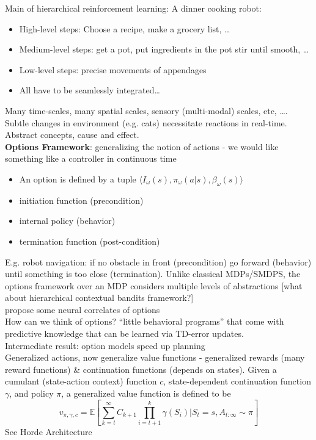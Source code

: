 \documentclass[12pt]{article}
\begin{document}
Main of hierarchical reinforcement learning: A dinner cooking robot:
\begin{itemize}
    \item High-level steps: Choose a recipe, make a grocery list, \ldots
    \item Medium-level steps: get a pot, put ingredients in the pot stir until smooth, \ldots
    \item Low-level steps: precise movements of appendages
    \item All have to be seamlessly integrated\ldots
\end{itemize}
Many time-scales, many spatial scales, sensory (multi-modal) scales, etc, \ldots. Subtle changes in environment (e.g. cats) necessitate reactions in real-time. Abstract concepts, cause and effect. \\

\textbf{Options Framework}\cite{Sutton98}: generalizing the notion of actions - we would like something like a controller in continuous time
\begin{itemize}
    \item An option is defined by a tuple $\langle I_\omega(s), \pi_\omega(a|s), \beta_\omega(s) \rangle$
    \item initiation function (precondition)
    \item internal policy (behavior)
    \item termination function (post-condition)
\end{itemize}
E.g. robot navigation: if no obstacle in front (precondition) go forward (behavior) until something is too close (termination). Unlike classical MDPs/SMDPS, the options framework over an MDP considers multiple levels of abstractions [what about hierarchical contextual bandits framework?] \\

\cite{Botvinick08} propose some neural correlates of options \\

How can we think of options? ``little behavioral programs'' that come with predictive knowledge that can be learned via TD-error updates. \\

Intermediate result: option models speed up planning \\

Generalized actions, now generalize value functions - generalized rewards (many reward functions) \& continuation functions (depends on states). Given a cumulant (state-action context) function $c$, state-dependent continuation function $\gamma$, and policy $\pi$, a generalized value function is defined to be 
$$v_{\pi, \gamma, c} = \mathbb{E}[\sum_{k=t}^\infty C_{k+1}\prod_{i=t+1}^k \gamma(S_i)|S_t = s, A_{t:\infty}\sim \pi]$$
See Horde Architecture \cite{Sutton11} \\
\end{document}
